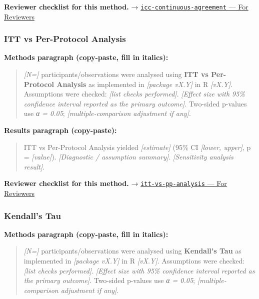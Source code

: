 \documentclass[
]{article}
\begin{document}
\textbf{Reviewer checklist for this method.} →
\href{../chapters/14-clinical/icc-continuous-agreement.Rmd\#for-reviewers}{\texttt{icc-continuous-agreement}
--- For Reviewers}

\subsubsection{ITT vs Per-Protocol
Analysis}\label{itt-vs-per-protocol-analysis}

\textbf{Methods paragraph (copy-paste, fill in italics):}

\begin{quote}
\emph{{[}N={]}} participants/observations were analysed using
\textbf{ITT vs Per-Protocol Analysis} as implemented in \emph{{[}package
vX.Y{]}} in R \emph{{[}vX.Y{]}}. Assumptions were checked: \emph{{[}list
checks performed{]}}. \emph{{[}Effect size with 95\% confidence interval
reported as the primary outcome{]}}. Two-sided p-values use \emph{α =
0.05}; \emph{{[}multiple-comparison adjustment if any{]}}.
\end{quote}

\textbf{Results paragraph (copy-paste):}

\begin{quote}
ITT vs Per-Protocol Analysis yielded \emph{{[}estimate{]}} (95\% CI
\emph{{[}lower, upper{]}}, p = \emph{{[}value{]}}). \emph{{[}Diagnostic
/ assumption summary{]}}. \emph{{[}Sensitivity analysis result{]}}.
\end{quote}

\textbf{Reviewer checklist for this method.} →
\href{../chapters/14-clinical/itt-vs-pp-analysis.Rmd\#for-reviewers}{\texttt{itt-vs-pp-analysis}
--- For Reviewers}

\subsubsection{Kendall's Tau}\label{kendalls-tau}

\textbf{Methods paragraph (copy-paste, fill in italics):}

\begin{quote}
\emph{{[}N={]}} participants/observations were analysed using
\textbf{Kendall's Tau} as implemented in \emph{{[}package vX.Y{]}} in R
\emph{{[}vX.Y{]}}. Assumptions were checked: \emph{{[}list checks
performed{]}}. \emph{{[}Effect size with 95\% confidence interval
reported as the primary outcome{]}}. Two-sided p-values use \emph{α =
0.05}; \emph{{[}multiple-comparison adjustment if any{]}}.
\end{quote}
\end{document}
